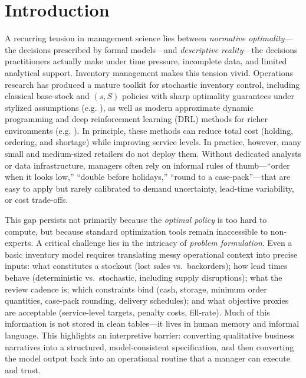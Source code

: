 \documentclass[mnsc,nonblindrev]{informs3_hide}
\begin{document}


\maketitle


\section{Introduction}
\label{sec:intro}

A recurring tension in management science lies between \emph{normative optimality}—the decisions prescribed by formal models—and \emph{descriptive reality}—the decisions practitioners actually make under time pressure, incomplete data, and limited analytical support. Inventory management makes this tension vivid. Operations research has produced a mature toolkit for stochastic inventory control, including classical base-stock and $(s,S)$ policies with sharp optimality guarantees under stylized assumptions (e.g. \cite{axsater2006inventory}), as well as modern approximate dynamic programming and deep reinforcement learning (DRL) methods for richer environments (e.g. \cite{madeka2022deep}). In principle, these methods can reduce total cost (holding, ordering, and shortage) while improving service levels. In practice, however, many small and medium-sized retailers do not deploy them. Without dedicated analysts or data infrastructure, managers often rely on informal rules of thumb—``order when it looks low,'' ``double before holidays,'' ``round to a case-pack''—that are easy to apply but rarely calibrated to demand uncertainty, lead-time variability, or cost trade-offs.

    


This gap persists not primarily because the \emph{optimal policy} is too hard to compute, but because standard optimization tools remain inaccessible to non-experts. A critical challenge lies in the intricacy of \emph{problem formulation}. Even a basic inventory model requires translating messy operational context into precise inputs: what constitutes a stockout (lost sales vs.\ backorders); how lead times behave (deterministic vs.\ stochastic, including supply disruptions); what the review cadence is; which constraints bind (cash, storage, minimum order quantities, case-pack rounding, delivery schedules); and what objective proxies are acceptable (service-level targets, penalty costs, fill-rate). Much of this information is not stored in clean tables—it lives in human memory and informal language. This highlights an interpretive barrier: converting qualitative business narratives into a structured, model-consistent specification, and then converting the model output back into an operational routine that a manager can execute and trust.
\end{document}
